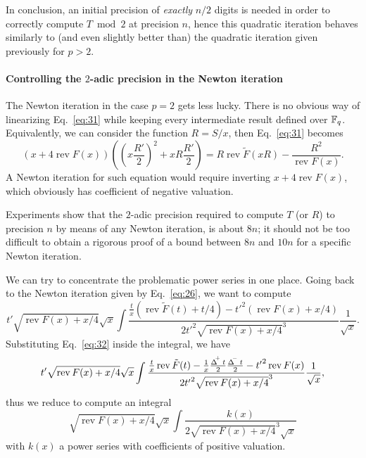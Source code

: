 \documentclass{article}
\DeclareMathOperator{\rev}{rev}
\DeclareMathOperator{\Dplus}{\Delta^{{}^{\kern-0.5ex +}}}
\DeclareMathOperator{\Dminus}{\Delta^{{}^{\kern-0.5ex -}}}
\begin{document}
In conclusion, an initial precision of \emph{exactly} $n/2$ digits is
needed in order to correctly compute $T\bmod 2$ at precision $n$,
hence this quadratic iteration behaves similarly to (and even slightly
better than) the quadratic iteration given previously for $p>2$.


\paragraph{Controlling the $2$-adic precision in the Newton iteration}
The Newton iteration in the case $p=2$ gets less lucky. There is no
obvious way of linearizing Eq.~\eqref{eq:31} while keeping every
intermediate result defined over $\mathbb{F}_q$. Equivalently, we can consider
the function $R = S/x$, then Eq.~\eqref{eq:31} becomes
\begin{equation}
  \label{eq:40}
  (x + 4\rev F(x))\left(\left(x\frac{R'}{2}\right)^2 + xR\frac{R'}{2}\right) =
  R\rev\tilde{F}(xR) - \frac{R^2}{\rev F(x)}.
\end{equation}
A Newton iteration for such equation would require inverting $x +
4\rev F(x)$, which obviously has coefficient of negative valuation.

Experiments show that the $2$-adic precision required to compute $T$
(or $R$) to precision $n$ by means of any Newton iteration, is about
$8n$; it should not be too difficult to obtain a rigorous proof of a
bound between $8n$ and $10n$ for a specific Newton iteration.

We can try to concentrate the problematic power series in one
place. Going back to the Newton iteration given by Eq.~\eqref{eq:26},
we want to compute
\begin{equation}
  \label{eq:41}
  t'\sqrt{\rev F(x) + x/4}\sqrt{x}
  \int \frac{\frac{t}{x}(\rev\tilde{F}(t) + t/4) - {t'}^2(\rev F(x) + x/4)}{2{t'}^2\sqrt{\rev F(x) + x/4}^3}
  \frac{1}{\sqrt{x}}.
\end{equation}
Substituting Eq.~\eqref{eq:32} inside the integral, we have
\begin{equation}
  \label{eq:42}
  t'\sqrt{\rev F(x) + x/4}\sqrt{x}
  \int \frac{\frac{t}{x}\rev\tilde{F}(t) - \frac{1}{x}\frac{\Dplus t}{2}\frac{\Dminus t}{2} - {t'}^2\rev F(x)}{2{t'}^2\sqrt{\rev F(x) + x/4}^3}
  \frac{1}{\sqrt{x}},
\end{equation}
thus we reduce to compute an integral
\begin{equation}
  \label{eq:43}
  \sqrt{\rev F(x) + x/4}\sqrt{x}  \int \frac{k(x)}{2\sqrt{\rev F(x) + x/4}^3\sqrt{x}}
\end{equation}
with $k(x)$ a power series with coefficients of positive valuation.
\end{document}
